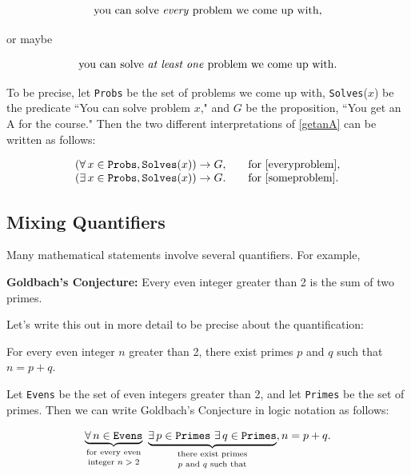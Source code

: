 \documentclass[11pt,oneside]{book}
\theoremstyle{definition}
\begin{document}
 \begin{equation} \text{you can solve \emph{every} problem we come up with,} \label{everyproblem} \end{equation}

or maybe

\begin{equation} \text{you can solve \emph{at least one} problem we come up with.} \label{someproblem} \end{equation}

To be precise, let \texttt{Probs} be the set of problems we come up with, \texttt{Solves}($x$) be the predicate ``You can solve problem $x$," and $G$ be the proposition, ``You get an A
for the course."
Then the two different interpretations of \eqref{getanA} can be written as follows:

\[\begin{array}{rcl}
    (\forall\, x \in \texttt{Probs}, \texttt{Solves}(x)) \rightarrow G, && \text{for \eqref{everyproblem}}, \\
    (\exists\, x \in \texttt{Probs}, \texttt{Solves}(x)) \rightarrow G. && \text{for \eqref{someproblem}}.
\end{array}\]


\subsection{Mixing Quantifiers}
Many mathematical statements involve several quantifiers.
For example,

\begin{center}
    \textbf{Goldbach's Conjecture:} Every even integer greater than 2 is the sum of two primes.
\end{center}

Let's write this out in more detail to be precise about the quantification:

\begin{center}
    For every even integer $n$ greater than 2, there exist primes $p$ and $q$ such that $n = p + q$.
\end{center}

Let \texttt{Evens} be the set of even integers greater than 2, and let \texttt{Primes} be the set of primes.
Then we can write Goldbach's Conjecture in logic notation as follows:

\[ \underbrace{\forall\, n \in \texttt{Evens}}_{\text{\shortstack{for every even\\integer $n > 2$}}}\ \underbrace{\exists\, p \in \texttt{Primes}\ \exists\, q \in \texttt{Primes}}_{\text{\shortstack{there exist primes\\$p$ and $q$ such that}}}, n = p + q. \]
\end{document}
